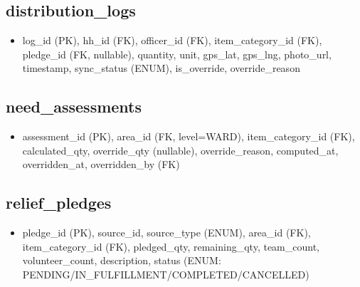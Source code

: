 \subsection{distribution\_logs}
\begin{itemize}[nosep]
    \item log\_id (PK), hh\_id (FK), officer\_id (FK), item\_category\_id (FK), pledge\_id (FK, nullable), quantity, unit, gps\_lat, gps\_lng, photo\_url, timestamp, sync\_status (ENUM), is\_override, override\_reason
\end{itemize}

\subsection{need\_assessments}
\begin{itemize}[nosep]
    \item assessment\_id (PK), area\_id (FK, level=WARD), item\_category\_id (FK), calculated\_qty, override\_qty (nullable), override\_reason, computed\_at, overridden\_at, overridden\_by (FK)
\end{itemize}

\subsection{relief\_pledges}
\begin{itemize}[nosep]
    \item pledge\_id (PK), source\_id, source\_type (ENUM), area\_id (FK), item\_category\_id (FK), pledged\_qty, remaining\_qty, team\_count, volunteer\_count, description, status (ENUM: PENDING/IN\_FULFILLMENT/COMPLETED/CANCELLED)
\end{itemize}
